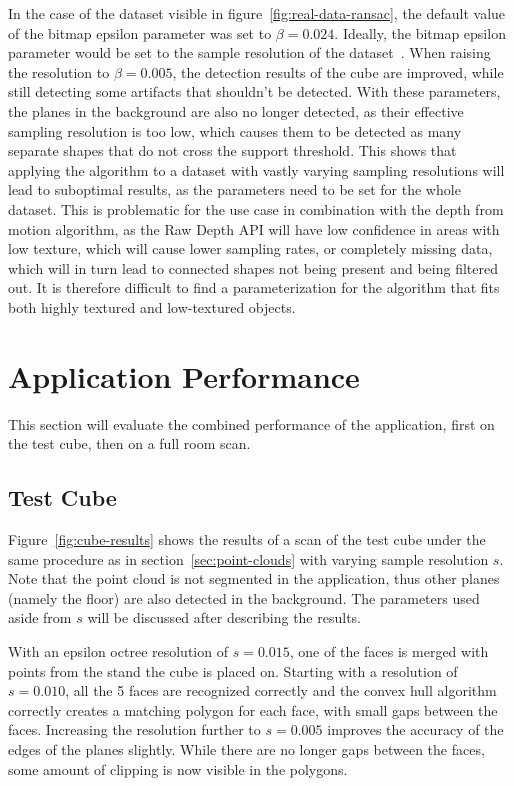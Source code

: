 In the case of the dataset visible in figure~\ref{fig:real-data-ransac},
the default value of the bitmap epsilon parameter was set to $\beta=0.024$.
Ideally, the bitmap epsilon parameter would be set to the sample resolution of the dataset~\parencite{schnabel_efficient_2007}.
When raising the resolution to $\beta=0.005$, the detection results of the cube are improved,
while still detecting some artifacts that shouldn't be detected.
With these parameters, the planes in the background are also no longer detected,
as their effective sampling resolution is too low, which causes them to be detected as many separate shapes that do not cross the support threshold.
This shows that applying the algorithm to a dataset with vastly varying sampling resolutions will
lead to suboptimal results, as the parameters need to be set for the whole dataset.
This is problematic for the use case in combination with the depth from motion algorithm, as the Raw Depth API
will have low confidence in areas with low texture, which will cause lower sampling rates, or completely missing data,
which will in turn lead to connected shapes not being present and being filtered out.
It is therefore difficult to find a parameterization for the algorithm that fits both highly textured and low-textured objects.


\section{Application Performance}\label{sec:application-performance}

This section will evaluate the combined performance of the application, first on the test cube, then on a full room scan.

\subsection{Test Cube}\label{subsec:application-performance-test-cube}
Figure~\ref{fig:cube-results} shows the results of a scan of the test cube under the same procedure as in section~\ref{sec:point-clouds} with varying sample resolution $s$.
Note that the point cloud is not segmented in the application, thus other planes (namely the floor) are also detected in the background.
The parameters used aside from $s$ will be discussed after describing the results.

With an epsilon octree resolution of $s=0.015$, one of the faces is merged with points from the stand the cube is placed on.
Starting with a resolution of $s=0.010$, all the 5 faces are recognized correctly and
the convex hull algorithm correctly creates a matching polygon for each face, with small gaps between the faces.
Increasing the resolution further to $s=0.005$ improves the accuracy of the edges of the planes slightly.
While there are no longer gaps between the faces, some amount of clipping is now visible in the polygons.

